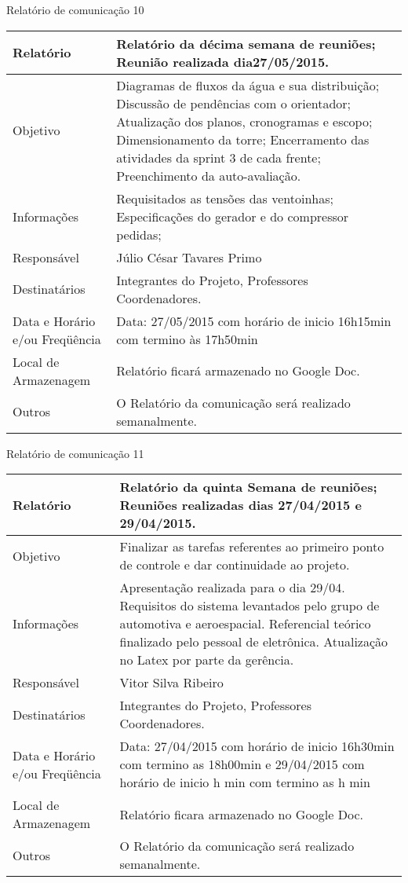 \begin{center}
{\large Relatório de comunicação 10}
\begin{table}[h]
\begin{tabular}{|p{6cm}|p{9cm}|}\hline
Relatório&Relatório da décima semana de reuniões; Reunião realizada dia27/05/2015.\\ \hline
Objetivo&Diagramas de fluxos da água e sua distribuição;
Discussão de pendências com o orientador;
Atualização dos planos, cronogramas e escopo;
Dimensionamento da torre;
Encerramento das atividades da sprint 3 de cada frente;
Preenchimento da auto-avaliação.\\ \hline
Informações&Requisitados as tensões das ventoinhas;
Especificações do gerador e do compressor pedidas;\\ \hline
Responsável&Júlio César Tavares Primo\\ \hline
Destinatários&Integrantes do Projeto, Professores Coordenadores.\\ \hline
Data e Horário e/ou Freqüência&Data: 27/05/2015 com horário de inicio 16h15min com termino às 17h50min\\ \hline
Local de Armazenagem&Relatório ficará armazenado no Google Doc.\\ \hline
Outros&O Relatório da comunicação será realizado semanalmente.\\ \hline
\end{tabular}
\end{table}
\FloatBarrier

{\large Relatório de comunicação 11}
\begin{table}[h]
\begin{tabular}{|p{6cm}|p{9cm}|}\hline
Relatório&Relatório da quinta Semana de reuniões; Reuniões realizadas dias 27/04/2015 e 29/04/2015.\\ \hline
Objetivo&Finalizar as tarefas referentes ao primeiro ponto de controle e dar continuidade ao projeto.\\ \hline
Informações&	Apresentação realizada para o dia 29/04.
Requisitos do sistema levantados pelo grupo de automotiva e aeroespacial.
Referencial teórico finalizado pelo pessoal de eletrônica.
Atualização no Latex por parte da gerência.\\ \hline
Responsável&Vitor Silva Ribeiro\\ \hline
Destinatários&Integrantes do Projeto, Professores Coordenadores.\\ \hline
Data e Horário e/ou Freqüência	&Data: 27/04/2015 com horário de inicio 16h30min com termino as 18h00min e 29/04/2015 com horário de inicio h min com termino as h min\\ \hline
Local de Armazenagem&Relatório ficara armazenado no Google Doc.\\ \hline
Outros	& O Relatório da comunicação será realizado semanalmente.\\ \hline
\end{tabular}
\end{table}
\FloatBarrier

\end{center}


% 